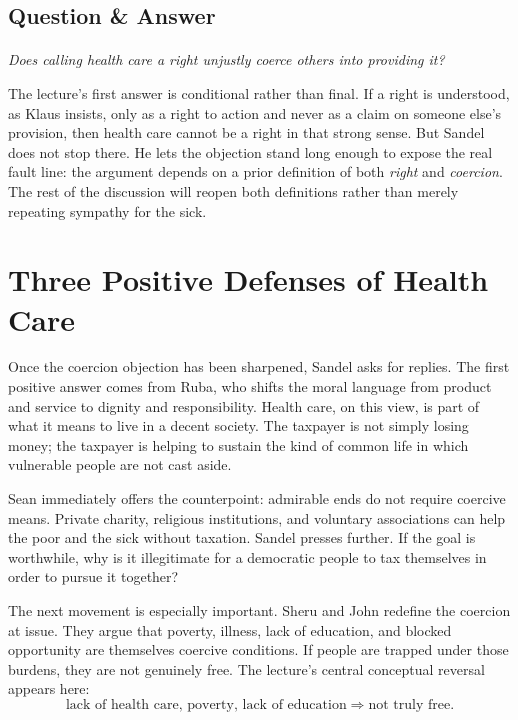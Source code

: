 \subsection{Question \& Answer}

\paragraph{}
\emph{Does calling health care a right unjustly coerce others into providing it?}

The lecture's first answer is conditional rather than final. If a right is understood, as Klaus insists, only as a right to action and never as a claim on someone else's provision, then health care cannot be a right in that strong sense. But Sandel does not stop there. He lets the objection stand long enough to expose the real fault line: the argument depends on a prior definition of both \emph{right} and \emph{coercion}. The rest of the discussion will reopen both definitions rather than merely repeating sympathy for the sick.

\section{Three Positive Defenses of Health Care}

Once the coercion objection has been sharpened, Sandel asks for replies. The first positive answer comes from Ruba, who shifts the moral language from product and service to dignity and responsibility. Health care, on this view, is part of what it means to live in a decent society. The taxpayer is not simply losing money; the taxpayer is helping to sustain the kind of common life in which vulnerable people are not cast aside.

Sean immediately offers the counterpoint: admirable ends do not require coercive means. Private charity, religious institutions, and voluntary associations can help the poor and the sick without taxation. Sandel presses further. If the goal is worthwhile, why is it illegitimate for a democratic people to tax themselves in order to pursue it together?

The next movement is especially important. Sheru and John redefine the coercion at issue. They argue that poverty, illness, lack of education, and blocked opportunity are themselves coercive conditions. If people are trapped under those burdens, they are not genuinely free. The lecture's central conceptual reversal appears here:
\begin{equation}
\text{lack of health care, poverty, lack of education}
\Longrightarrow
\text{not truly free}.
\end{equation}

